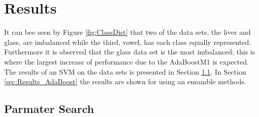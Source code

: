 \section{Results}
\label{sec:Results}

It can bee seen by Figure \ref{fig:ClassDist} that two of the data sets, the  liver and glass, are imbalanced while the third, vowel, has each class equally represented.
Furthermore it is observed that the glass data set is the most imbalanced; this is where the largest increase of performance due to the AdaBoostM1 is expected.
The results of an SVM on the data sets is presented in Section \ref{sec:Results_ParamSearch}.
In Section \ref{sec:Results_AdaBoost} the results are shown for using an ensamble methods.

\subsection{Parmater Search}
\label{sec:Results_ParamSearch}

